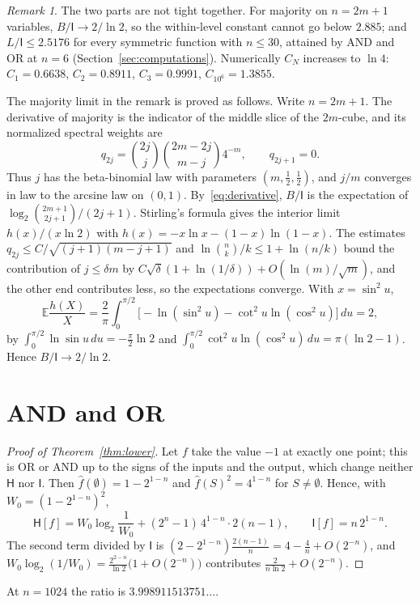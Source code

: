 \documentclass[11pt]{amsart}
\theoremstyle{definition}
\theoremstyle{remark}
\newtheorem{remark}[theorem]{Remark}
\newcommand{\E}{\mathbb E}
\newcommand{\HH}{\mathsf H}
\newcommand{\I}{\mathsf I}
\newcommand{\wh}[1]{\widehat{#1}}
\begin{document}
\begin{remark}
The two parts are not tight together. For majority on $n=2m+1$ variables, $B/\I\to2/\ln2$, so the within-level constant cannot go below $2.885$; and $L/\I\le2.5176$ for every symmetric function with $n\le30$, attained by AND and OR at $n=6$ (Section~\ref{sec:computations}). Numerically $C_N$ increases to $\ln4$: $C_1=0.6638$, $C_2=0.8911$, $C_3=0.9991$, $C_{10^6}=1.3855$.
\end{remark}

The majority limit in the remark is proved as follows. Write $n=2m+1$. The derivative of majority is the indicator of the middle slice of the $2m$-cube, and its normalized spectral weights are
\[
 q_{2j}=\binom{2j}{j}\binom{2m-2j}{m-j}4^{-m},\qquad q_{2j+1}=0.
\]
Thus $j$ has the beta-binomial law with parameters $(m,\tfrac12,\tfrac12)$, and $j/m$ converges in law to the arcsine law on $(0,1)$. By~\eqref{eq:derivative}, $B/\I$ is the expectation of $\log_2\binom{2m+1}{2j+1}/(2j+1)$. Stirling's formula gives the interior limit $h(x)/(x\ln2)$ with $h(x)=-x\ln x-(1-x)\ln(1-x)$. The estimates $q_{2j}\le C/\sqrt{(j+1)(m-j+1)}$ and $\ln\binom nk/k\le1+\ln(n/k)$ bound the contribution of $j\le\delta m$ by $C\sqrt\delta(1+\ln(1/\delta))+O(\ln(m)/\sqrt m)$, and the other end contributes less, so the expectations converge. With $x=\sin^2u$,
\[
 \E\frac{h(X)}X=\frac2\pi\int_0^{\pi/2}\bigl[-\ln(\sin^2u)-\cot^2u\ln(\cos^2u)\bigr]\,du=2,
\]
by $\int_0^{\pi/2}\ln\sin u\,du=-\frac\pi2\ln2$ and $\int_0^{\pi/2}\cot^2u\ln(\cos^2u)\,du=\pi(\ln2-1)$. Hence $B/\I\to2/\ln2$.

\section{AND and OR}\label{sec:lower}

\begin{proof}[Proof of Theorem~\ref{thm:lower}]
Let $f$ take the value $-1$ at exactly one point; this is OR or AND up to the signs of the inputs and the output, which change neither $\HH$ nor $\I$. Then $\wh f(\emptyset)=1-2^{1-n}$ and $\wh f(S)^2=4^{1-n}$ for $S\ne\emptyset$. Hence, with $W_0=(1-2^{1-n})^2$,
\[
 \HH[f]=W_0\log_2\frac1{W_0}+(2^n-1)\,4^{1-n}\cdot2(n-1),\qquad \I[f]=n\,2^{1-n}.
\]
The second term divided by $\I$ is $(2-2^{1-n})\frac{2(n-1)}n=4-\frac4n+O(2^{-n})$, and $W_0\log_2(1/W_0)=\frac{2^{2-n}}{\ln2}\bigl(1+O(2^{-n})\bigr)$ contributes $\frac{2}{n\ln2}+O(2^{-n})$.
\end{proof}

At $n=1024$ the ratio is $3.998911513751\ldots$.
\end{document}

